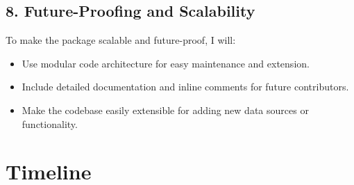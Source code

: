 \documentclass{article}
\begin{document}
\subsection{8. Future-Proofing and Scalability}
To make the package scalable and future-proof, I will:
\begin{itemize}
    \item Use modular code architecture for easy maintenance and extension.
    \item Include detailed documentation and inline comments for future contributors.
    \item Make the codebase easily extensible for adding new data sources or functionality.
\end{itemize}



\section{Timeline}
\end{document}
